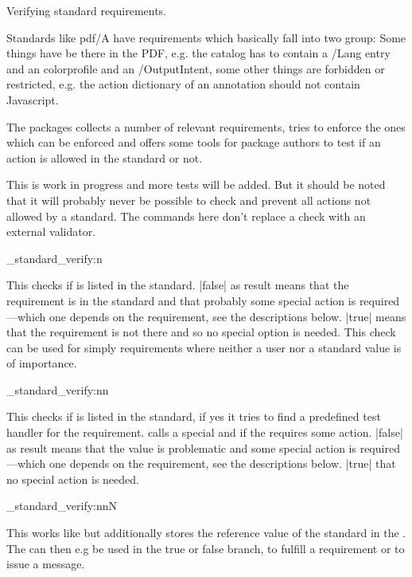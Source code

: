 \documentclass{l3doc}
\begin{document}
Verifying standard requirements.

Standards like pdf/A have requirements which basically fall into two group: Some things have be there in the PDF, e.g. the catalog has to contain a /Lang entry and an colorprofile and an /OutputIntent, some other things are forbidden or restricted, e.g. the action dictionary of an annotation should not contain Javascript.

The  packages collects a number of relevant requirements, tries to enforce the ones which can be enforced and offers some tools for package authors to test if an action is allowed in the standard or not.

This is work in progress and more tests will be added. But it should be noted that it will probably never be possible to check and prevent all actions not allowed by a standard. The commands here don't replace a check with an external validator.


\begin{function}[pTF]{\pdfmeta_standard_verify:n}
\begin{syntax}
\end{syntax}

This checks if  is listed in the standard. |false| as result means that the requirement is in the standard and that probably some special action is required---which one depends on the requirement, see the descriptions below.
|true| means that the requirement is not there and so no special option is needed.
This check can be used for simply requirements where neither a user nor a standard value is of importance.
\end{function}

\begin{function}[pTF]{\pdfmeta_standard_verify:nn}
\begin{syntax}
\end{syntax}

This checks if  is listed in the standard, if yes it tries to find a predefined test handler for 
the requirement.   calls a special  and if the  requires some action.
|false| as result means that the value is problematic and some special action is required---which one depends on the requirement, see the descriptions below. |true| that no special action is needed.
\end{function}

\begin{function}[pTF]{\pdfmeta_standard_verify:nnN}
\begin{syntax}
 
\end{syntax}
This works like  but additionally stores the reference value of the standard
in the . The  can then e.g be used in the true or false branch, to fulfill a requirement or to issue a message.
\end{function}
\end{document}
